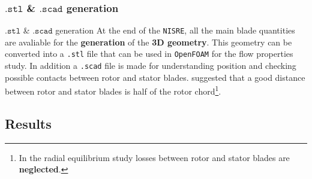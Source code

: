 \subsubsection{$\mathtt{.stl}$ \& $\mathtt{.scad}$ generation}
	\begin{frame}[fragile]{$\mathtt{.stl}$ \& $\mathtt{.scad}$ generation}
		At the end of the \verb|NISRE|, all the main blade quantities are avaliable for the \textbf{generation} of the \textbf{3D geometry}. This geometry can be converted into a \verb|.stl| file that can be used in \verb|OpenFOAM| for the flow properties study. In addition a \verb|.scad| file is made for understanding position and checking possible contacts between rotor and stator blades.	
		\newline
		\newline 
		\cite{baskharone2006principles} suggested that a good distance between rotor and stator blades is half of the rotor chord\footnote{In the radial equilibrium study losses between rotor \newline and stator blades are \textbf{neglected}.}.
	\end{frame}
\subsection{Results}
